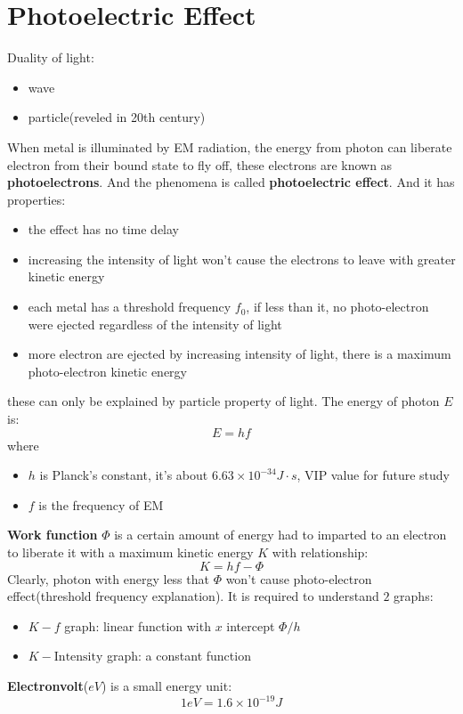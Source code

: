 \documentclass[10pt,a4paper,oneside]{article}
\begin{document}
\section{Photoelectric Effect}
Duality of light:
\begin{itemize}
	\item wave
	\item particle(reveled in 20th century)
\end{itemize}
When metal is illuminated by EM radiation, the energy from photon can liberate electron from their bound state to fly off, these electrons are known as \textbf{photoelectrons}. And the phenomena is called \textbf{photoelectric effect}. And it has properties:
\begin{itemize}
	\item the effect has no time delay
	\item increasing the intensity of light won't cause the electrons to leave with greater kinetic energy
	\item each metal has a threshold frequency $f_0$, if less than it, no photo-electron were ejected regardless of the intensity of light
	\item more electron are ejected by increasing intensity of light, there is a maximum photo-electron kinetic energy
	\it
\end{itemize}
these can only be explained by particle property of light. The energy of photon $E$ is:
\[
E = hf
\]
where
\begin{itemize}
	\item $h$ is Planck's constant, it's about $6.63\times10^{-34}J \cdot s$, VIP value for future study
	\item $f$ is the frequency of EM
\end{itemize}
\textbf{Work function} $\Phi$ is a certain amount of energy had to imparted to an electron to liberate it with a maximum kinetic energy $K$ with relationship:
\[
K = hf - \Phi
\]
Clearly, photon with energy less that $\Phi$ won't cause photo-electron effect(threshold frequency explanation). It is required to understand $2$ graphs:
\begin{itemize}
	\item $K-f$ graph: linear function with $x$ intercept $\Phi/h$
	\item $K-\text{Intensity}$ graph: a constant function
\end{itemize}
\textbf{Electronvolt}($eV$) is a small energy unit:
\[
1 eV = 1.6 \times 10^{-19} J
\]
\end{document}
